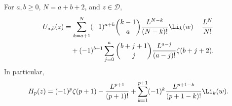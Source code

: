 \begin{theorem}
\label{one2:thm:closed}
For $a,b\ge0$, $N=a+b+2$, and $z\in\mathcal D$,
\begin{align}
 U_{a,b}(z)
 &=\sum_{k=a+1}^{N}(-1)^{a+k}\binom{k-1}{a}
       \frac{L^{N-k}}{(N-k)!}\Li_k(w)
       -\frac{L^N}{N!}\notag\\
 &\quad+(-1)^{b+1}\sum_{j=0}^{a}\binom{b+j+1}{j}
       \frac{L^{a-j}}{(a-j)!}\zeta(b+j+2).
 \label{one2:eq:closed}
\end{align}
In particular,
\begin{equation}
 H_p(z)=(-1)^p\zeta(p+1)-\frac{L^{p+1}}{(p+1)!}
 +\sum_{k=1}^{p+1}(-1)^k
       \frac{L^{p+1-k}}{(p+1-k)!}\Li_k(w).
 \label{one2:eq:height}
\end{equation}
\end{theorem}
